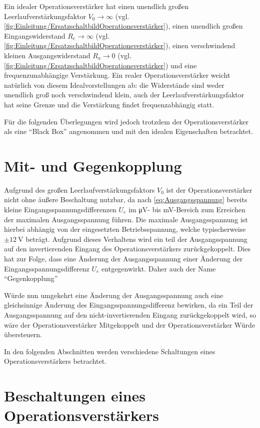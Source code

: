 Ein idealer Operationsverstärker hat einen unendlich großen 
Leerlaufverstärkungsfaktor $V_0 \rightarrow \infty$ (vgl. 
\cref{fig:Einleitung/ErsatzschaltbildOperationsverstärker}), einen unendlich 
großen 
Eingangswiderstand $R_e \rightarrow \infty$ (vgl. 
\cref{fig:Einleitung/ErsatzschaltbildOperationsverstärker}), einen 
verschwindend kleinen Ausgangswiderstand $R_a \rightarrow 0$ (vgl. 
\cref{fig:Einleitung/ErsatzschaltbildOperationsverstärker}) und eine 
frequenzunabhängige Verstärkung. Ein realer Operationsverstärker weicht 
natürlich von diesem Idealvorstellungen ab: die Widerstände sind weder 
unendlich groß noch verschwindend klein, auch der Leerlaufverstärkungsfaktor 
hat seine Grenze und die Verstärkung findet frequenzabhängig statt.

Für die folgenden Überlegungen wird jedoch trotzdem der Operationsverstärker 
als eine "`Black Box"' angenommen und mit den idealen Eigenschaften betrachtet.

\section{Mit- und Gegenkopplung}
Aufgrund des großen Leerlaufverstärkungsfaktors $V_0$ ist der 
Operationsverstärker nicht ohne äußere Beschaltung nutzbar, da nach
\cref{eq:Ausgangsspannung} bereits kleine Eingangsspannungsdifferenzen $U_e$ im
\unit{\micro\V}- bis \unit{\mV}-Bereich zum Erreichen der maximalen 
Ausgangsspannung führen. Die maximale Ausgangsspannung ist hierbei abhängig von
der eingesetzten Betriebsspannung, welche typischerweise $\pm \qty{12}{\V}$
beträgt. Aufgrund dieses Verhaltens wird ein teil der Ausgangsspannung
auf den invertierenden Eingang des Operationsverstärkers zurückgekoppelt. Dies
hat zur Folge, dass eine Änderung der Ausgangsspannung einer Änderung der
Eingangsspannungsdifferenz $U_e$ entgegenwirkt. Daher auch der Name 
"`Gegenkopplung"'

Würde nun umgekehrt eine Änderung der Ausgangsspannung auch eine gleichsinnige
Änderung des Eingangsspannungsdifferenz bewirken, da ein Teil der 
Ausgangsspannung auf den nicht-invertierenden Eingang zurückgekoppelt wird, so
wäre der Operationsverstärker Mitgekoppelt und der Operationsverstärker Würde
übersteuern.

In den folgenden Abschnitten werden verschiedene Schaltungen eines 
Operationsverstärkers betrachtet.

\section{Beschaltungen eines Operationsverstärkers}
